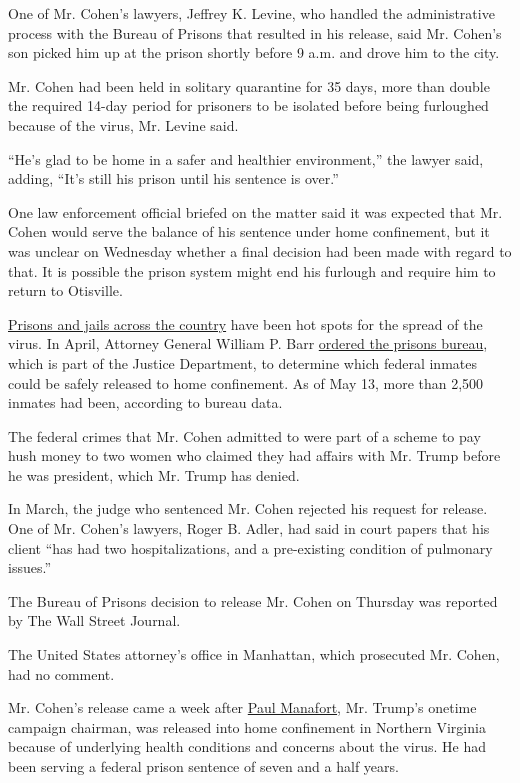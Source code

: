 One of Mr. Cohen's lawyers, Jeffrey K. Levine, who handled the
administrative process with the Bureau of Prisons that resulted in his
release, said Mr. Cohen's son picked him up at the prison shortly before
9 a.m. and drove him to the city.

Mr. Cohen had been held in solitary quarantine for 35 days, more than
double the required 14-day period for prisoners to be isolated before
being furloughed because of the virus, Mr. Levine said.

``He's glad to be home in a safer and healthier environment,'' the
lawyer said, adding, ``It's still his prison until his sentence is
over.''

One law enforcement official briefed on the matter said it was expected
that Mr. Cohen would serve the balance of his sentence under home
confinement, but it was unclear on Wednesday whether a final decision
had been made with regard to that. It is possible the prison system
might end his furlough and require him to return to Otisville.

\href{https://slack-redir.net/link?url=https\%3A\%2F\%2Fwww.nytimes.com\%2F2020\%2F03\%2F30\%2Fus\%2Fcoronavirus-prisons-jails.html}{Prisons
and jails across the country} have been hot spots for the spread of the
virus. In April, Attorney General William P. Barr
\href{https://slack-redir.net/link?url=https\%3A\%2F\%2Fwww.nytimes.com\%2F2020\%2F04\%2F03\%2Fus\%2Fpolitics\%2Fbarr-coronavirus-prisons-release.html}{ordered
the prisons bureau}, which is part of the Justice Department, to
determine which federal inmates could be safely released to home
confinement. As of May 13, more than 2,500 inmates had been, according
to bureau data.

The federal crimes that Mr. Cohen admitted to were part of a scheme to
pay hush money to two women who claimed they had affairs with Mr. Trump
before he was president, which Mr. Trump has denied.

In March, the judge who sentenced Mr. Cohen rejected his request for
release. One of Mr. Cohen's lawyers, Roger B. Adler, had said in court
papers that his client ``has had two hospitalizations, and a
pre-existing condition of pulmonary issues.''

The Bureau of Prisons decision to release Mr. Cohen on Thursday was
reported by The Wall Street Journal.

The United States attorney's office in Manhattan, which prosecuted Mr.
Cohen, had no comment.

Mr. Cohen's release came a week after
\href{https://slack-redir.net/link?url=https\%3A\%2F\%2Fwww.nytimes.com\%2F2020\%2F05\%2F13\%2Fus\%2Fpolitics\%2Fpaul-manafort-released-coronavirus.html}{Paul
Manafort}, Mr. Trump's onetime campaign chairman, was released into home
confinement in Northern Virginia because of underlying health conditions
and concerns about the virus. He had been serving a federal prison
sentence of seven and a half years.

